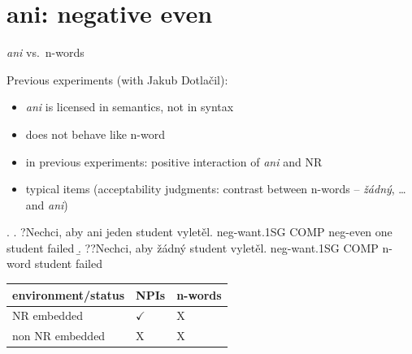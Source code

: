 \documentclass[ignorenonframetext,]{beamer}
\providecommand{\tightlist}{%
  \setlength{\itemsep}{0pt}\setlength{\parskip}{0pt}}
\begin{document}
\begin{frame}

\end{frame}

\section{ani: negative even}\label{ani-negative-even}

\begin{frame}{\emph{ani} vs.~n-words}

Previous experiments (with Jakub Dotlačil):

\begin{itemize}
\tightlist
\item
  \emph{ani} is licensed in semantics, not in syntax
\item
  does not behave like n-word
\item
  in previous experiments: positive interaction of \emph{ani} and NR
\item
  typical items (acceptability judgments: contrast between n-words --
  \emph{žádný}, \ldots{} and \emph{ani})
\end{itemize}

\ex. \a. ?Nechci, aby ani jeden student vyletěl.\newline
 neg-want.1SG COMP neg-even one student failed \b. ??Nechci, aby žádný
student vyletěl.\newline
 neg-want.1SG COMP n-word student failed

\end{frame}

\begin{frame}

\begin{longtable}[]{@{}lll@{}}
\toprule
environment/status & NPIs & n-words\tabularnewline
\midrule
\endhead
NR embedded & \(\checkmark\) & X\tabularnewline
non NR embedded & X & X\tabularnewline
\bottomrule
\end{longtable}

\end{frame}
\end{document}
